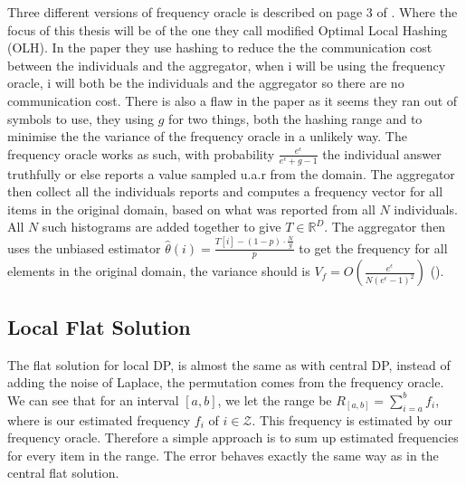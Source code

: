 \documentclass[11pt]{article}
\theoremstyle{definition}
\begin{document}
\noindent Three different versions of frequency oracle is described on page 3 of \cite{local} . Where the focus of this thesis will be of the one they call modified Optimal Local Hashing (OLH). In the paper they use hashing to reduce the the communication cost between the individuals and the aggregator, when i will be using the frequency oracle, i will both be the individuals and the aggregator so there are no communication cost. There is also a flaw in the paper as it seems they ran out of symbols to use, they using $g$ for two things, both the hashing range and to minimise the the variance of the frequency oracle in a unlikely way. The frequency oracle works as such, with  probability $\frac{e^{\epsilon}}{e^{\epsilon}+g-1}$ the individual answer truthfully or else reports a value sampled u.a.r from the domain. The aggregator then collect all the individuals reports and  computes a frequency vector for all items in the original domain, based on what was reported from all $N$ individuals. All $N$ such histograms are added together to give $T\in\mathbb{R}^D$. The aggregator then uses the unbiased estimator $\hat{\theta}(i)= \frac{T[i] - (1-p) \cdot \frac{N}{g} }{p}$ to get the frequency for all elements in the original domain, the variance should is  $V_f= O\left(\frac{e^{\epsilon}}{N\left(e^{\epsilon}-1\right)^{2}}\right)$ (\cite[3]{local}). 
\subsection{Local Flat Solution}
The flat solution for local DP, is almost the same as with central DP, instead of adding the noise of Laplace, the permutation comes from the frequency oracle. 
We can see that for an interval $[a,b]$, we let the range be $R_{[a,b]}=\sum_{i=a}^b f_i$, where is our estimated frequency $f_i$ of $i\in \mathcal{Z}$. This frequency is estimated by our frequency oracle. Therefore a simple approach is to sum up estimated frequencies for every item in the range. The error behaves exactly the same way as in the central flat solution.
\end{document}
